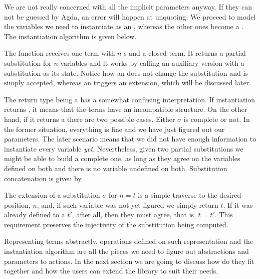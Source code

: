 We are not really concerned with all the implicit parameters anyway. If they can not be guessed by Agda, an error will happen at unquoting. We proceed to
model the variables we need to instantiate as an , whereas the other ones become a . The instantiation algorithm is given below. 


The  function receives one term with $n$ s and a closed term. It returns a partial substitution for $n$ variables and it works by calling an auxiliary version with a substitution as its state. Notice how an  does not change the substitution and is simply accepted, whereas an  triggers an extension, which will be discussed later.

The return type being a  has a somewhat confusing interpretation. If instantiation returns , it means that the terms have an incompatible structure. On the other hand, if it returns a  there are two possible cases. Either $\sigma$ is complete or not. In the former situation, everything is fine and we have just figured out our parameters. The later scenario means that we did not have enough information to instantiate every variable \emph{yet}. Nevertheless, given two partial substitutions we might be able to build a complete one, as long as they agree on the variables defined on both and there is no variable undefined on both. Substitution concatenation is given by .


The extension of a substitution $\sigma$ for $n = t$ is a simple traverse to the desired position, $n$, and, if such variable was not yet figured we simply return $t$. If it was already defined to a $t'$, after all, then they must agree, that is, $t = t'$. This requirement preserves the injectivity of
the substitution being computed. 


Representing terms abstractly, operations defined on such representation and
the instantiation algorithm are all the pieces we need to figure out abstractions and parameters to actions. In the next section we are going to
discuss how do they fit together and how the users can extend the library
to suit their needs.
 
